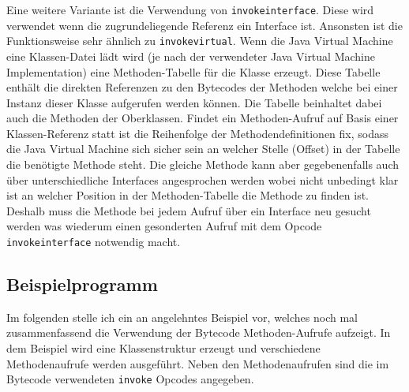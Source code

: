 \documentclass[conference]{IEEEtran}
\begin{document}
Eine weitere Variante ist die Verwendung von \verb|invokeinterface|. Diese wird verwendet wenn die zugrundeliegende Referenz ein Interface ist. Ansonsten ist die Funktionsweise sehr ähnlich zu \verb|invokevirtual|. Wenn die Java Virtual Machine eine Klassen-Datei lädt wird (je nach der verwendeter Java Virtual Machine Implementation) eine Methoden-Tabelle für die Klasse erzeugt. Diese Tabelle enthält die direkten Referenzen zu den Bytecodes der Methoden welche bei einer Instanz dieser Klasse aufgerufen werden können. Die Tabelle beinhaltet dabei auch die Methoden der Oberklassen. Findet ein Methoden-Aufruf auf Basis einer Klassen-Referenz statt ist die Reihenfolge der Methodendefinitionen fix, sodass die Java Virtual Machine sich sicher sein an welcher Stelle (Offset) in der Tabelle die benötigte Methode steht. Die gleiche Methode kann aber gegebenenfalls auch über unterschiedliche Interfaces angesprochen werden wobei nicht unbedingt klar ist an welcher Position in der Methoden-Tabelle die Methode zu finden ist. Deshalb muss die Methode bei jedem Aufruf über ein Interface neu gesucht werden was wiederum einen gesonderten Aufruf mit dem Opcode \verb|invokeinterface| notwendig macht.\cite{Venners.1997}

\subsection{Beispielprogramm}
Im folgenden stelle ich ein an \cite{Venners.1997} angelehntes Beispiel vor, welches noch mal zusammenfassend die Verwendung der Bytecode Methoden-Aufrufe aufzeigt. In dem Beispiel wird eine Klassenstruktur erzeugt und verschiedene Methodenaufrufe werden ausgeführt. Neben den Methodenaufrufen sind die im Bytecode verwendeten \verb|invoke| Opcodes angegeben. 
\end{document}
